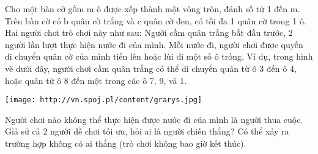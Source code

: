 Cho một bàn cờ gồm m ô được xếp thành một vòng tròn, đánh số từ 1 đến m. Trên bàn cờ có b quân cờ trắng và c quân cờ đen, có tối đa 1 quân cờ trong 1 ô. Hai người chơi trò chơi này như sau: Người cầm quân trắng bắt đầu trước, 2 người lần lượt thực hiện nước đi của mình. Mỗi nước đi, người chơi được quyền di chuyển quân cờ của mình tiến lên hoặc lùi đi một số ô trống. Ví dụ, trong hình vẽ dưới đây, người chơi cầm quân trắng có thể di chuyển quân từ ô 3 đến ô 4, hoặc quân từ ô 8 đến một trong các ô 7, 9, và 1.  


\texttt{[image: http://vn.spoj.pl/content/grarys.jpg]}

   Người chơi nào không thể thực hiện được nước đi của mình là người thua cuộc. Gỉả sử cả 2 người đề chơi tối ưu, hỏi ai là người chiến thắng? Có thể xảy ra trường hợp không có ai thắng (trò chơi không bao giờ kết thúc).